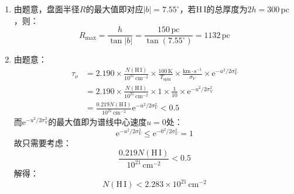 \documentclass[a4paper,fontset=none]{ctexart}
\begin{document}
\begin{enumerate}
    \medskip
    \item[29.1 (b)]
    由题意，盘面半径$R$的最大值即对应$|b| = 7.55^\circ$，若$\mathrm{H\,I}$的总厚度为$2h = 300\,\mathrm{pc}$，则：
    \[
        R_{\mathrm{max}} = \frac{h}{\tan|b|} = \frac{150\,\mathrm{pc}}{\tan(7.55^\circ)} = 1132\,\mathrm{pc}
    \]

    \medskip
    \item[29.1 (c)]
    由题意：
    \begin{align*}
        \tau_\nu
        &= 2.190 \times \frac{N(\mathrm{H\,I})}{10^{21}\,\mathrm{cm^{-2}}} \times \frac{100\,\mathrm{K}}{T_{\mathrm{spin}}} \times \frac{\mathrm{km \cdot s^{-1}}}{\sigma_V} \times \mathrm{e}^{-u^2/2\sigma_V^2} \\
        &= 2.190 \times \frac{N(\mathrm{H\,I})}{10^{21}\,\mathrm{cm^{-2}}} \times 1 \times \frac{1}{10} \times \mathrm{e}^{-u^2/2\sigma_V^2} \\
        &= \frac{0.219 N(\mathrm{H\,I})}{10^{21}\,\mathrm{cm^{-2}}} \mathrm{e}^{-u^2/2\sigma_V^2}
        < 0.5
    \end{align*}
    而$\mathrm{e}^{-u^2/2\sigma_V^2}$的最大值即为谱线中心速度$u = 0$处：
    \[
        \mathrm{e}^{-u^2/2\sigma_V^2} \leqslant \mathrm{e}^{-0^2/2\sigma_V^2} = 1
    \]
    故只需要考虑：
    \[
        \frac{0.219 N(\mathrm{H\,I})}{10^{21}\,\mathrm{cm^{-2}}} < 0.5
    \]
    解得：
    \[
        N(\mathrm{H\,I}) < 2.283 \times 10^{21}\,\mathrm{cm^{-2}}
    \]

\end{enumerate}
\end{document}
